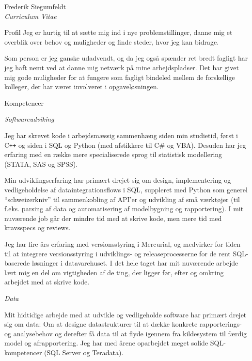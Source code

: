 \documentclass[a4paper]{article}
\newcommand*{\ac}[1]{\mbox{#1}}
\begin{document}
\begin{cv}{Frederik Siegumfeldt\\{\large \itshape Curriculum Vitae}}
\begin{cvlist}{Profil}
    Jeg er hurtig til at sætte mig ind i nye problemstillinger, 
    danne mig et overblik over behov og muligheder og finde steder, 
    hvor jeg kan bidrage.

    Som person er jeg ganske udadvendt, og da jeg også spænder ret bredt
    fagligt har jeg haft nemt ved at danne mig netværk på mine 
    arbejdspladser. Det har givet mig gode muligheder for at fungere som
    fagligt bindeled mellem de forskellige kolleger, der har været 
    involveret i opgaveløsningen.

\end{cvlist}

\begin{cvlist}{Kompetencer}          

  \item[\emph{Softwareudviking}]

    Jeg har skrevet kode i arbejdsmæssig sammenhæng siden min 
    studietid, først i C{}\verb!++! og siden i SQL og Python 
    (med afstikkere til C\# og VBA). Desuden har jeg erfaring med en 
    række mere specialiserede sprog til statistisk modellering 
    (\ac{STATA}, \ac{SAS} og \ac{SPSS}).

    Min udviklingserfaring har primært drejet sig om design, 
    implementering og vedligeholdelse af dataintegrationsflows i SQL,
    suppleret med Python som generel ``schweizer\-kniv'' til
    sammenkobling af API'er og udvikling af små værktøjer (til
    f.eks. parsing af data og automatisering af modelbygning og
    rapportering). I mit nuværende job går der mindre tid med at 
    skrive kode, men mere tid med kravsspecs og reviews.

    Jeg har fire års erfaring med versionsstyring i Mercurial, og 
    medvirker for tiden til at integrere versionsstyring i udviklings-
    og release\-processerne for de rent SQL-baserede løsninger i 
    datavarehuset. I det hele taget har mit nuværende arbejde lært mig 
    en del om vigtigheden af de ting, der ligger før, efter og omkring 
    arbejdet med at skrive kode.

  \item[\emph{Data}]

    Mit hidtidige arbejde med at udvikle og vedligeholde software har 
    primært drejet sig om data: Om at designe datastrukturer til at 
    dække konkrete rappor\-terings- og analysebehov og derefter få data 
    til at flyde igennem fra kildesystem til færdig model og 
    afrapportering. Jeg har med årene oparbejdet meget solide 
    SQL-kompetencer (SQL Server og Teradata).


\end{cvlist}
\end{cv}
\end{document}
